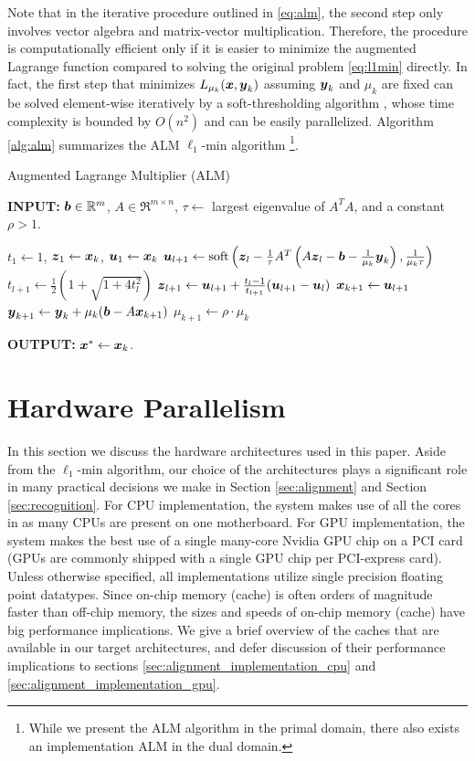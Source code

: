 \documentclass[10pt,twocolumn,letterpaper]{article}
\begin{document}
Note that in the iterative procedure outlined in \eqref{eq:alm}, the second
step only involves vector algebra and matrix-vector multiplication. Therefore,
the procedure is computationally efficient only if it is easier to minimize the
augmented Lagrange function compared to solving the original problem
\eqref{eq:l1min} directly. In fact, the first step that minimizes $L_{\mu_k}
({\boldsymbol{x}},{\boldsymbol{y}}_k)$ assuming ${\boldsymbol{y}}_k$ and $\mu_k$ are fixed can be solved element-wise
iteratively by a soft-thresholding algorithm \cite{WrightS2008,BeckA2009},
whose time complexity is bounded by $O(n^2)$ and can be easily parallelized.
Algorithm \eqref{alg:alm} summarizes the ALM $\ell_1$-min algorithm \footnote{While we
present the ALM algorithm in the primal domain, there also
exists an implementation ALM in the dual domain.}.

 \begin{algorithm}[h]
\caption{Augmented Lagrange Multiplier (ALM)}
{\bf INPUT:} ${\boldsymbol{b}} \in {\mathbb{R}}^m$, $A \in \Re^{m \times n}$, $\tau\leftarrow$ largest eigenvalue of $A^TA$, and a constant $\rho>1$.
\begin{algorithmic}[1]
 \STATE $t_1 \leftarrow 1$, ${\boldsymbol{z}}_1
\leftarrow {\boldsymbol{x}}_k$, ${\boldsymbol{u}}_1 \leftarrow {\boldsymbol{x}}_k$  \STATE ${\boldsymbol{u}}_{l+1}  \leftarrow
\mathrm{soft}\left({\boldsymbol{z}}_l - \frac{1}{\tau}A^T\left(A{\boldsymbol{z}}_l - {\boldsymbol{b}}
- \frac{1}{\mu_k}{\boldsymbol{y}}_k\right), \frac{1}{\mu_k\tau}\right)$
\STATE $t_{l+1} \leftarrow \frac{1}{2}\left( 1 +
\sqrt{1+4t_l^2}\right)$ \STATE ${\boldsymbol{z}}_{l+1} \leftarrow {\boldsymbol{u}}_{l+1}
+ \frac{t_l - 1}{t_{l+1}}({\boldsymbol{u}}_{l+1} - {\boldsymbol{u}}_l)$ \ENDWHILE \STATE$
{\boldsymbol{x}}_{k+1} \leftarrow {\boldsymbol{u}}_{l+1}$ \STATE ${\boldsymbol{y}}_{k+1} \leftarrow
{\boldsymbol{y}}_k + \mu_k ({\boldsymbol{b}} - A{\boldsymbol{x}}_{k+1})$ \STATE $\mu_{k+1} \leftarrow
\rho\cdot\mu_k$ \ENDWHILE 
\end{algorithmic}

{\bf OUTPUT:} ${\boldsymbol{x}}^* \leftarrow {\boldsymbol{x}}_k$.
\label{alg:alm}
\end{algorithm}

\section{Hardware Parallelism} \label{sec:parallelism} 
In this section we discuss the hardware architectures used in this paper. Aside
from the $\ell_1$-min algorithm, our choice of the architectures plays a
significant role in many practical decisions we make in Section
\ref{sec:alignment} and Section \ref{sec:recognition}.  For CPU implementation,
the system makes use of all the cores in as many CPUs are present on one
motherboard.  For GPU implementation, the system makes the best use of a
single many-core Nvidia GPU chip on a PCI card (GPUs are commonly shipped with
a single GPU chip per PCI-express card).  Unless otherwise specified, all
implementations utilize single precision floating point datatypes.  Since on-chip
memory (cache) is often orders of magnitude faster than off-chip memory, the sizes
and speeds of on-chip memory (cache) have big performance implications.  We give
a brief overview of the caches that are available in our target architectures,
and defer discussion of their performance implications to sections
\ref{sec:alignment_implementation_cpu} and
\ref{sec:alignment_implementation_gpu}.
\end{document}
